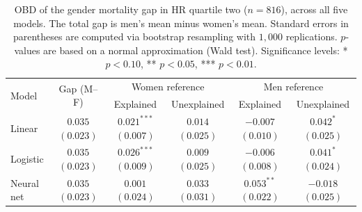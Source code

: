 \begin{table}[!ht]
    \caption{OBD of the gender mortality gap in HR quartile two ($n = 816$), across all five models. The total gap is men's mean minus women's mean. Standard errors in parentheses are computed via bootstrap resampling with $1{,}000$ replications. $p$-values are based on a normal approximation (Wald test). Significance levels: * $p<0.10$, ** $p<0.05$, *** $p<0.01$.}
    \label{tab:hrq2_bootstrap_models}
    \centering
    \scriptsize
    \begin{tabular}{@{}lc*{4}{c}@{}}
    \toprule
    \multirow{2}{*}{Model} &
    \multirow{2}{*}{Gap (M--F)} &
    \multicolumn{2}{c}{Women reference} &
    \multicolumn{2}{c}{Men reference} \\
    \cmidrule(lr){3-4} \cmidrule(lr){5-6}
    & & Explained & Unexplained & Explained & Unexplained \\
    \midrule

    Linear
        & \makecell{$0.035$ \\ $(0.023)$}
        & \makecell{$0.021^{***}$ \\ $(0.007)$}
        & \makecell{$0.014$ \\ $(0.025)$}
        & \makecell{$-0.007$ \\ $(0.010)$}
        & \makecell{$0.042^{*}$ \\ $(0.025)$} \\[0.3em]

    Logistic
        & \makecell{$0.035$ \\ $(0.023)$}
        & \makecell{$0.026^{***}$ \\ $(0.009)$}
        & \makecell{$0.009$ \\ $(0.025)$}
        & \makecell{$-0.006$ \\ $(0.008)$}
        & \makecell{$0.041^{*}$ \\ $(0.024)$} \\[0.3em]

    Neural net
        & \makecell{$0.035$ \\ $(0.023)$}
        & \makecell{$0.001$ \\ $(0.024)$}
        & \makecell{$0.033$ \\ $(0.031)$}
        & \makecell{$0.053^{**}$ \\ $(0.022)$}
        & \makecell{$-0.018$ \\ $(0.025)$} \\[0.3em]


\end{tabular}
\end{table}
